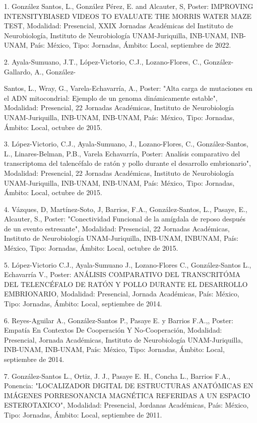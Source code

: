 1. González Santos, L., González Pérez, E. and Alcauter, S, Poster: IMPROVING INTENSITYBIASED VIDEOS 
TO EVALUATE THE MORRIS WATER MAZE TEST, Modalidad: Presencial, XXIX Jornadas Académicas del 
Instituto de Neurobiología, Instituto de Neurobiología UNAM-Juriquilla, INB-UNAM, INB-UNAM, País: 
México, Tipo: Jornadas, Ámbito: Local, septiembre de 2022.

2. Ayala-Sumuano, J.T., López-Victorio, C.J., Lozano-Flores, C., González-Gallardo, A., González-

Santos, L., Wray, G., Varela-Echavarría, A., Poster: "Alta carga de mutaciones en el ADN 
mitocondrial: Ejemplo de un genoma dinámicamente estable", Modalidad: Presencial, 22 Jornadas 
Académicas, Instituto de Neurobiología UNAM-Juriquilla, INB-UNAM, INB-UNAM, País: México, Tipo: 
Jornadas, Ámbito: Local, octubre de 2015.

3. López-Victorio, C.J., Ayala-Sumuano, J., Lozano-Flores, C., González-Santos, L., Linares-Belman, 
P.B., Varela Echavarría, Poster: Analísis comparativo del transcriptoma del talencéfalo de ratón y 
pollo durante el desarrollo embrionario", Modalidad: Presencial, 22 Jornadas Académicas, Instituto 
de Neurobiología UNAM-Juriquilla, INB-UNAM, INB-UNAM, País: México, Tipo: Jornadas, Ámbito: Local, 
octubre de 2015.

4. Vázques, D, Martínez-Soto, J, Barrios, F.A., González-Santos, L., Pasaye, E., Alcauter, S., 
Poster: "Conectividad Funcional de la amígdala de reposo después de un evento estresante", 
Modalidad: Presencial, 22 Jornadas Académicas, Instituto de Neurobiología UNAM-Juriquilla, INB-UNAM, 
INBUNAM, País: México, Tipo: Jornadas, Ámbito: Local, octubre de 2015.

5. López-Victorio C.J., Ayala-Sumuano J., Lozano-Flores C., González-Santos L., Echavarría V., 
Poster: ANÁLISIS COMPARATIVO DEL TRANSCRITÓMA DEL TELENCÉFALO DE RATÓN Y POLLO DURANTE EL DESARROLLO 
EMBRIONARIO, Modalidad: Presencial, Jornada Académicas, País: México, Tipo: Jornadas, Ámbito: Local, 
septiembre de 2014.

6. Reyes-Aguilar A., González-Santos P., Pasaye E. y Barrios F.A.,, Poster: Empatía En Contextos De 
Cooperación Y No-Cooperación, Modalidad: Presencial, Jornada Académicas, Instituto de Neurobiología 
UNAM-Juriquilla, INB-UNAM, INB-UNAM, País: México, Tipo: Jornadas, Ámbito: Local, septiembre de 
2014.

7. González-Santos L., Ortiz, J. J., Pasaye E. H., Concha L., Barrios F.A., Ponencia: "LOCALIZADOR 
DIGITAL DE ESTRUCTURAS ANATÓMICAS EN IMÁGENES PORRESONANCIA MAGNÉTICA REFERIDAS A UN ESPACIO 
ESTEROTAXICO", Modalidad: Presencial, Jordanas Académicas, País: México, Tipo: Jornadas, Ámbito: 
Local, septiembre de 2011.

